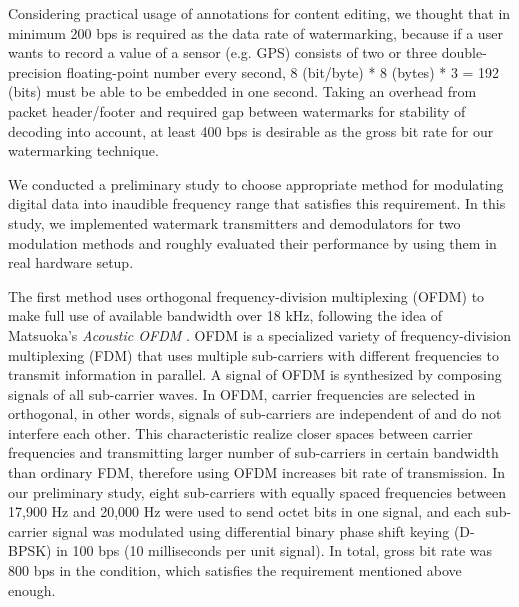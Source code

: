 Considering practical usage of annotations for content editing, we thought that in minimum 200 bps is required as the data rate of watermarking, because if a user wants to record a value of a sensor (e.g. GPS) consists of two or three double-precision floating-point number every second, 8 (bit/byte) * 8 (bytes) * 3 = 192 (bits) must be able to be embedded in one second.
Taking an overhead from packet header/footer and required gap between watermarks for stability of decoding into account, at least 400 bps is desirable as the gross bit rate for our watermarking technique.

We conducted a preliminary study to choose appropriate method for modulating digital data into inaudible frequency range that satisfies this requirement.
In this study, we implemented watermark transmitters and demodulators for two modulation methods and roughly evaluated their performance by using them in real hardware setup.

The first method uses orthogonal frequency-division multiplexing (OFDM) to make full use of available bandwidth over 18 kHz, following the idea of Matsuoka's {\it Acoustic OFDM} \cite{matsuoka2008acoustic}.
OFDM is a specialized variety of frequency-division 
multiplexing (FDM) that uses multiple sub-carriers with different frequencies to transmit information in parallel.
A signal of OFDM is synthesized by composing signals of all sub-carrier waves.
In OFDM, carrier frequencies are selected in orthogonal, in other words, signals of sub-carriers are independent of and do not interfere each other.
This characteristic realize closer spaces between carrier frequencies and transmitting larger number of sub-carriers in certain bandwidth than ordinary FDM, therefore using OFDM increases bit rate of transmission.
In our preliminary study, eight sub-carriers with equally spaced frequencies between 17,900 Hz and 20,000 Hz were used to send octet bits in one signal, and each sub-carrier signal was modulated using differential binary phase shift keying (D-BPSK) in 100 bps (10 milliseconds per unit signal).
In total, gross bit rate was 800 bps in the condition, which satisfies the requirement mentioned above enough.

